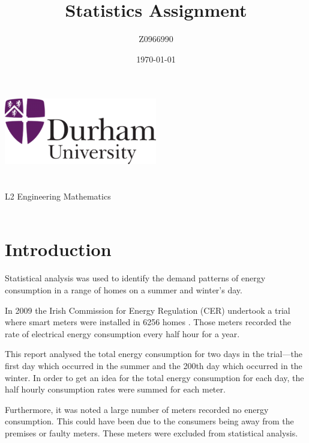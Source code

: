 \documentclass[a4paper,10pt]{article}
\author{Z0966990}
\title{Statistics Assignment}
\date{\today}
\begin{document}
    
\begin{titlepage}
    \centering
    \vspace*{\fill}
    \includegraphics[width=0.5\textwidth]{Durham}\\
    \vspace*{\fill}
    \LARGE\thetitle\\
    \large\theauthor\\
    \large L2 Engineering Mathematics\\
    \large\thedate\\
    \vspace*{\fill}
\end{titlepage}

\printnomenclature

\section{Introduction}

Statistical analysis was used to identify the demand patterns of energy 
consumption in a range of homes on a summer and winter's day.

In 2009 the Irish Commission for Energy Regulation (CER) undertook a trial 
where smart meters were installed in 6256 homes \cite{martinsmart}. Those 
meters recorded the rate  of electrical energy consumption every half hour for 
a year.

This report analysed the total energy consumption for two days in the 
trial---the first day which occurred in the summer and the 200th day which 
occurred in the winter. In order to get an idea for the total energy 
consumption for each day, the half hourly consumption rates were summed for 
each meter.

Furthermore, it was noted a large number of meters recorded no energy 
consumption. This could have been due to the consumers being away from the 
premises or faulty meters. These meters were excluded from statistical 
analysis. 
\end{document}
